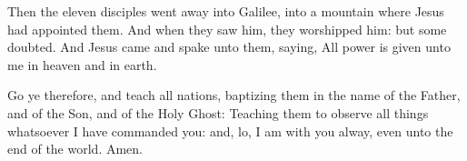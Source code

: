  Then the eleven disciples went away into Galilee, into a
mountain where Jesus had appointed them.  And when they saw
him, they worshipped him: but some doubted.  And Jesus came
and spake unto them, saying, All power is given unto me in heaven and in
earth.

 Go ye therefore, and teach all nations, baptizing them in
the name of the Father, and of the Son, and of the Holy Ghost:
 Teaching them to observe all things whatsoever I have
commanded you: and, lo, I am with you alway, even unto the end of the
world. Amen.
